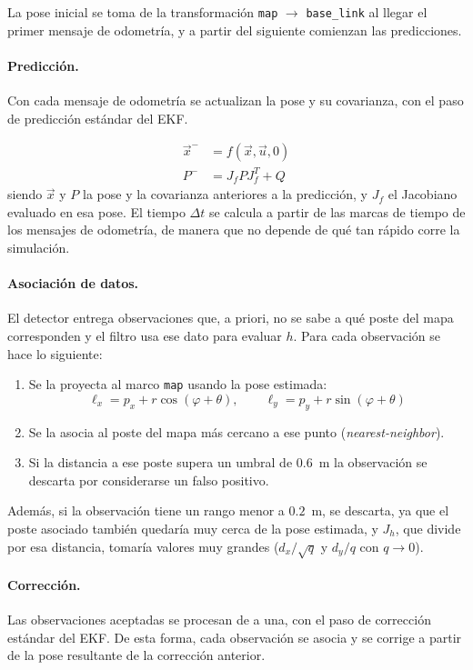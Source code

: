 \documentclass[11pt,a4paper]{article}
\begin{document}
La pose inicial se toma de la transformación \texttt{map} $\rightarrow$ \texttt{base\_link} al llegar el primer mensaje de odometría, y a partir del siguiente comienzan las predicciones.

\paragraph{Predicción.} Con cada mensaje de odometría se actualizan la pose y su covarianza, con el paso de predicción estándar del EKF.

\begin{align}
\vec{x}^- &= f(\vec{x},\vec{u},0) \\
P^- &= J_f P J_f^T + Q
\end{align}
siendo $\vec{x}$ y $P$ la pose y la covarianza anteriores a la predicción, y $J_f$ el Jacobiano evaluado en esa pose. El tiempo $\Delta t$ se calcula a partir de las marcas de tiempo de los mensajes de odometría, de manera que no depende de qué tan rápido corre la simulación.

\paragraph{Asociación de datos.} El detector entrega observaciones que, a priori, no se sabe a qué poste del mapa corresponden y el filtro usa ese dato para evaluar $h$. Para cada observación se hace lo siguiente: 
\begin{enumerate}
    \item Se la proyecta al marco \texttt{map} usando la pose estimada:
    \begin{equation}
    \ell_x = p_x + r\cos(\varphi + \theta), \qquad \ell_y = p_y + r\sin(\varphi + \theta)
    \end{equation}
    \item Se la asocia al poste del mapa más cercano a ese punto (\emph{nearest-neighbor}).
    \item Si la distancia a ese poste supera un umbral de $0.6$~m la observación se descarta por considerarse un falso positivo.
\end{enumerate}

Además, si la observación tiene un rango menor a $0.2$~m, se descarta, ya que el poste asociado también quedaría muy cerca de la pose estimada, y $J_h$, que divide por esa distancia, tomaría valores muy grandes ($d_x/\sqrt{q}$ y $d_y/q$ con $q \to 0$).

\paragraph{Corrección.} Las observaciones aceptadas se procesan de a una, con el paso de corrección estándar del EKF. De esta forma, cada observación se asocia y se corrige a partir de la pose resultante de la corrección anterior.
\end{document}
